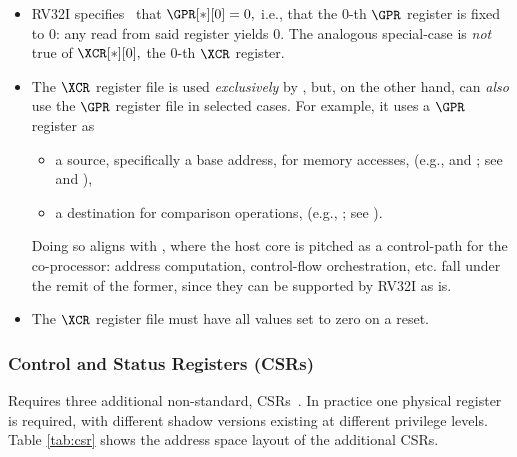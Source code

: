 \begin{itemize}
\item RV32I specifies~\cite[Section 2.1]{SCARV:RV:ISA:I:17} that
      $
      \GPR[*][0] = 0 ,
      $
      i.e., that the $0$-th $\GPR$ register is fixed to $0$: any read from 
      said register yields $0$.  The analogous special-case is {\em not} 
      true of 
      $
      \XCR[*][0] ,
      $
      the $0$-th $\XCR$ register.
\item The $\XCR$ register file is used {\em exclusively} by \XCID, but, on
      the other hand, \XCID can {\em also} use the $\GPR$ register file in 
      selected cases.  For example, it uses a $\GPR$ register as

      \begin{itemize}
      \item a source, specifically a base address, for memory accesses,
            (e.g.,  and ; see  and ),
      \item a destination for comparison operations,
            (e.g., ; see ).
      \end{itemize}

      \noindent
      Doing so aligns with , where the host core is 
      pitched as a control-path for the co-processor: address computation,
      control-flow orchestration, etc. fall under the remit of the former, 
      since they can be supported by RV32I as is.
\item The $\XCR$ register file must have all values set to zero on a reset.
\end{itemize}    


\subsubsection{Control and Status Registers (CSRs)}
\label{sec:spec:state:csr}

\XCID 
Requires three additional
non-standard, CSRs~\cite[Section 2]{SCARV:RV:ISA:II:17}.
In practice one physical register is required, with different shadow
versions existing at different privilege levels.
Table \ref{tab:csr} shows the address space layout of the additional
CSRs.


